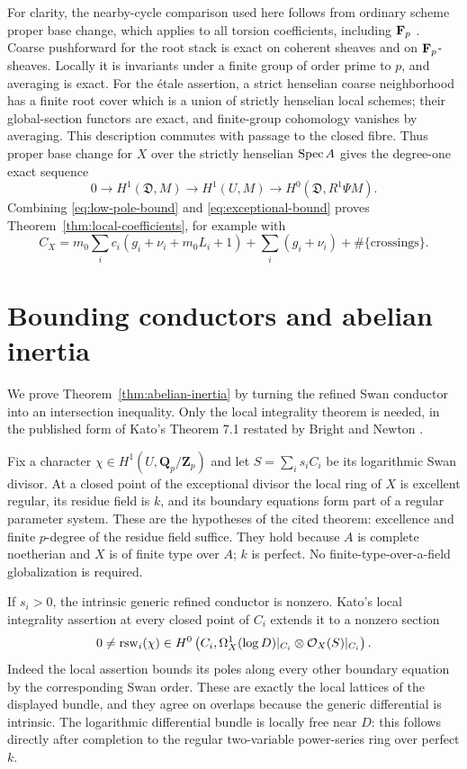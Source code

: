 For clarity, the nearby-cycle comparison used here follows from ordinary scheme proper base change, which applies to all torsion coefficients, including $\mathbf F_p$ \cite[Theorem 59.91.11, Tag 095S]{Stacks}. Coarse pushforward for the root stack is exact on coherent sheaves and on $\mathbf F_p$-sheaves. Locally it is invariants under a finite group of order prime to $p$, and averaging is exact. For the \'etale assertion, a strict henselian coarse neighborhood has a finite root cover which is a union of strictly henselian local schemes; their global-section functors are exact, and finite-group cohomology vanishes by averaging. This description commutes with passage to the closed fibre. Thus proper base change for $X$ over the strictly henselian $\operatorname{Spec} A$ gives the degree-one exact sequence
\[
 0\longrightarrow H^1(\mathfrak D,M)\longrightarrow H^1(U,M)
      \longrightarrow H^0(\mathfrak D,R^1\Psi M).
\]
Combining \eqref{eq:low-pole-bound} and \eqref{eq:exceptional-bound} proves Theorem~\ref{thm:local-coefficients}, for example with
\[
 C_X=m_0\sum_i c_i(g_i+\nu_i+m_0L_i+1)
          +\sum_i(g_i+\nu_i)+\#\{\text{crossings}\}.
\]

\section{Bounding conductors and abelian inertia}\label{sec:abelian-inertia}

We prove Theorem~\ref{thm:abelian-inertia} by turning the refined Swan conductor into an intersection inequality. Only the local integrality theorem is needed, in the published form of Kato's Theorem 7.1 restated by Bright and Newton \cite[Theorem 4.1, \S4.3, pp.~848--849]{BN}.

Fix a character $\chi\in H^1(U,\mathbf Q_p/\mathbf Z_p)$ and let $S=\sum_i s_i C_i$ be its logarithmic Swan divisor. At a closed point of the exceptional divisor the local ring of $X$ is excellent regular, its residue field is $k$, and its boundary equations form part of a regular parameter system. These are the hypotheses of the cited theorem: excellence and finite $p$-degree of the residue field suffice. They hold because $A$ is complete noetherian and $X$ is of finite type over $A$; $k$ is perfect. No finite-type-over-a-field globalization is required.

If $s_i>0$, the intrinsic generic refined conductor is nonzero. Kato's local integrality assertion at every closed point of $C_i$ extends it to a nonzero section
\begin{equation}\label{eq:rsw-section}
 0\ne\operatorname{rsw}_i(\chi)\in
 H^0\left(C_i,\Omega_X^1(\log D)|_{C_i}\otimes\mathcal O_X(S)|_{C_i}\right).
\end{equation}
Indeed the local assertion bounds its poles along every other boundary equation by the corresponding Swan order. These are exactly the local lattices of the displayed bundle, and they agree on overlaps because the generic differential is intrinsic. The logarithmic differential bundle is locally free near $D$: this follows directly after completion to the regular two-variable power-series ring over perfect $k$.

